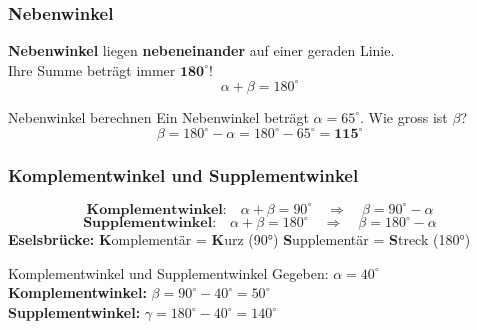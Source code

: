 \documentclass[12pt, a4paper]{article}
\begin{document}
\subsubsection*{Nebenwinkel}

\begin{winkelbox}
\textbf{Nebenwinkel} liegen \textbf{nebeneinander} auf einer geraden Linie.\\
Ihre Summe betr\"agt immer $\mathbf{180^\circ}$!
\[
  \boxed{\alpha + \beta = 180^\circ}
\]
\end{winkelbox}

\begin{center}
\end{center}

\begin{examplebox}{Nebenwinkel berechnen}
Ein Nebenwinkel betr\"agt $\alpha = 65^\circ$. Wie gross ist $\beta$?
\[
  \beta = 180^\circ - \alpha = 180^\circ - 65^\circ = \mathbf{115^\circ}
\]
\end{examplebox}

\subsubsection*{Komplementwinkel und Supplementwinkel}

\begin{formulabox}
\[
  \textbf{Komplementwinkel:} \quad \alpha + \beta = 90^\circ \quad \Rightarrow \quad \beta = 90^\circ - \alpha
\]
\[
  \textbf{Supplementwinkel:} \quad \alpha + \beta = 180^\circ \quad \Rightarrow \quad \beta = 180^\circ - \alpha
\]
\textbf{Eselsbrücke:} \textbf{K}omplementär = \textbf{K}urz (90°) \quad \textbf{S}upplementär = \textbf{S}treck (180°)
\end{formulabox}

\begin{examplebox}{Komplementwinkel und Supplementwinkel}
Gegeben: $\alpha = 40^\circ$\\[0.2cm]
\textbf{Komplementwinkel:} $\beta = 90^\circ - 40^\circ = 50^\circ$\\
\textbf{Supplementwinkel:} $\gamma = 180^\circ - 40^\circ = 140^\circ$
\end{examplebox}
\end{document}
